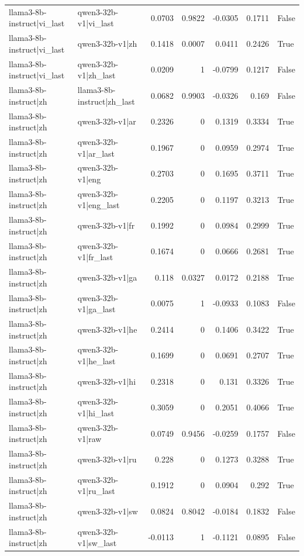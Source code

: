 \begin{table}
\begin{tabular}{l l r r r r l}
llama3-8b-instruct|vi_last & qwen3-32b-v1|vi_last & 0.0703 & 0.9822 & -0.0305 & 0.1711 & False \\
llama3-8b-instruct|vi_last & qwen3-32b-v1|zh & 0.1418 & 0.0007 & 0.0411 & 0.2426 & True \\
llama3-8b-instruct|vi_last & qwen3-32b-v1|zh_last & 0.0209 & 1 & -0.0799 & 0.1217 & False \\
llama3-8b-instruct|zh & llama3-8b-instruct|zh_last & 0.0682 & 0.9903 & -0.0326 & 0.169 & False \\
llama3-8b-instruct|zh & qwen3-32b-v1|ar & 0.2326 & 0 & 0.1319 & 0.3334 & True \\
llama3-8b-instruct|zh & qwen3-32b-v1|ar_last & 0.1967 & 0 & 0.0959 & 0.2974 & True \\
llama3-8b-instruct|zh & qwen3-32b-v1|eng & 0.2703 & 0 & 0.1695 & 0.3711 & True \\
llama3-8b-instruct|zh & qwen3-32b-v1|eng_last & 0.2205 & 0 & 0.1197 & 0.3213 & True \\
llama3-8b-instruct|zh & qwen3-32b-v1|fr & 0.1992 & 0 & 0.0984 & 0.2999 & True \\
llama3-8b-instruct|zh & qwen3-32b-v1|fr_last & 0.1674 & 0 & 0.0666 & 0.2681 & True \\
llama3-8b-instruct|zh & qwen3-32b-v1|ga & 0.118 & 0.0327 & 0.0172 & 0.2188 & True \\
llama3-8b-instruct|zh & qwen3-32b-v1|ga_last & 0.0075 & 1 & -0.0933 & 0.1083 & False \\
llama3-8b-instruct|zh & qwen3-32b-v1|he & 0.2414 & 0 & 0.1406 & 0.3422 & True \\
llama3-8b-instruct|zh & qwen3-32b-v1|he_last & 0.1699 & 0 & 0.0691 & 0.2707 & True \\
llama3-8b-instruct|zh & qwen3-32b-v1|hi & 0.2318 & 0 & 0.131 & 0.3326 & True \\
llama3-8b-instruct|zh & qwen3-32b-v1|hi_last & 0.3059 & 0 & 0.2051 & 0.4066 & True \\
llama3-8b-instruct|zh & qwen3-32b-v1|raw & 0.0749 & 0.9456 & -0.0259 & 0.1757 & False \\
llama3-8b-instruct|zh & qwen3-32b-v1|ru & 0.228 & 0 & 0.1273 & 0.3288 & True \\
llama3-8b-instruct|zh & qwen3-32b-v1|ru_last & 0.1912 & 0 & 0.0904 & 0.292 & True \\
llama3-8b-instruct|zh & qwen3-32b-v1|sw & 0.0824 & 0.8042 & -0.0184 & 0.1832 & False \\
llama3-8b-instruct|zh & qwen3-32b-v1|sw_last & -0.0113 & 1 & -0.1121 & 0.0895 & False \\

\end{tabular}
\end{table}
